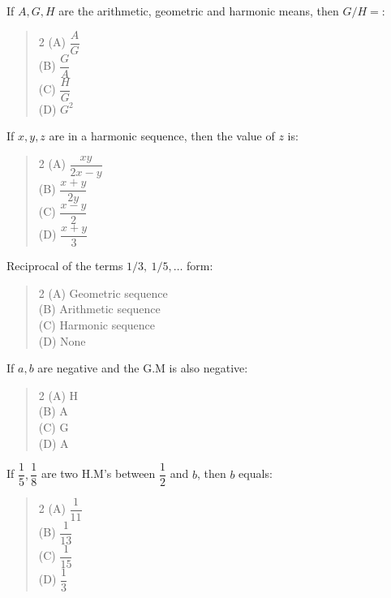 \documentclass[11pt,a4paper]{article}
\begin{document}
\begin{mcqlist}
\item If $A,G,H$ are the arithmetic, geometric and harmonic means, then $G/H=$:
\begin{quote}\begin{multicols}{2}
\noindent (A) $\dfrac{A}{G}$ \\
(B) $\dfrac{G}{A}$ \\
(C) $\dfrac{H}{G}$ \\
(D) $G^2$
\end{multicols}\end{quote}

\item If $x,y,z$ are in a harmonic sequence, then the value of $z$ is:
\begin{quote}\begin{multicols}{2}
\noindent (A) $\dfrac{xy}{2x-y}$ \\
(B) $\dfrac{x+y}{2y}$ \\
(C) $\dfrac{x-y}{2}$ \\
(D) $\dfrac{x+y}{3}$
\end{multicols}\end{quote}

\item Reciprocal of the terms $1/3,\ 1/5,\ldots$ form:
\begin{quote}\begin{multicols}{2}
\noindent (A) Geometric sequence \\
(B) Arithmetic sequence \\
(C) Harmonic sequence \\
(D) None
\end{multicols}\end{quote}

\item If $a,b$ are negative and the G.M is also negative:
\begin{quote}\begin{multicols}{2}
\noindent (A) H \\
(B) A \\
(C) G \\
(D) A
\end{multicols}\end{quote}

\item If $\dfrac{1}{5},\dfrac{1}{8}$ are two H.M's between $\dfrac{1}{2}$ and $b$, then $b$ equals:
\begin{quote}\begin{multicols}{2}
\noindent (A) $\dfrac{1}{11}$ \\
(B) $\dfrac{1}{13}$ \\
(C) $\dfrac{1}{15}$ \\
(D) $\dfrac{1}{3}$
\end{multicols}\end{quote}


\end{mcqlist}
\end{document}
